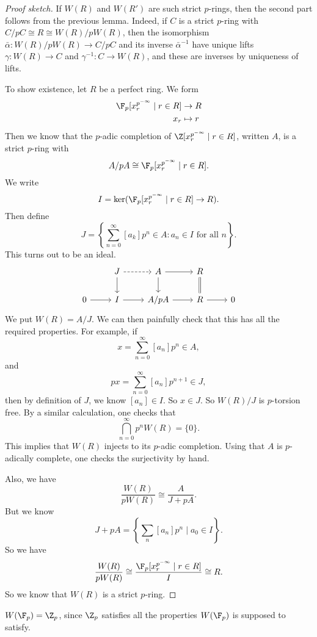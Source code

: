 \documentclass[a4paper]{article}
\begin{document}
\begin{proof}[Proof sketch]
  If $W(R)$ and $W(R')$ are such strict $p$-rings, then the second part follows from the previous lemma. Indeed, if $C$ is a strict $p$-ring with $C/pC \cong R \cong W(R)/pW(R)$, then the isomorphism $\bar{\alpha}: W(R)/pW(R) \to C/pC$ and its inverse $\bar{\alpha}^{-1}$ have unique lifts $\gamma: W(R) \to C$ and $\gamma^{-1}: C \to W(R)$, and these are inverses by uniqueness of lifts.

  To show existence, let $R$ be a perfect ring. We form
  \begin{align*}
    \F_p[x_r^{p^{-\infty}}\mid r \in R] &\to R\\
    x_r&\mapsto r
  \end{align*}
  Then we know that the $p$-adic completion of $\Z[x_r^{p^{-\infty}}\mid r \in R]$, written $A$, is a strict $p$-ring with
  \[
    A/pA \cong \F_p[x_r^{p^{-\infty}}\mid r \in R].
  \]
  We write
  \[
    I = \ker(\F_p[x_r^{p^{-\infty}}\mid r \in R] \to R).
  \]
  Then define
  \[
    J = \left\{\sum_{n = 0}^\infty [a_k] p^n \in A: a_n \in I\text{ for all $n$}\right\}.
  \]
  This turns out to be an ideal.
  \[
    \begin{tikzcd}
      & J \ar[r, dashed] \ar[d] & A \ar[r] \ar[d] & R \ar[d, equals]\\
      0 \ar[r] & I \ar[r] & A/pA \ar[r] & R \ar[r] & 0
    \end{tikzcd}
  \]
  We put $W(R) = A/J$. We can then painfully check that this has all the required properties. For example, if
  \[
    x = \sum_{n = 0}^\infty [a_n] p^n \in A,
  \]
  and
  \[
    px = \sum_{n = 0}^\infty [a_n] p^{n + 1} \in J,
  \]
  then by definition of $J$, we know $[a_n] \in I$. So $x \in J$. So $W(R)/J$ is $p$-torsion free. By a similar calculation, one checks that
  \[
    \bigcap_{n = 0}^\infty p^n W(R) = \{0\}.
  \]
  This implies that $W(R)$ injects to its $p$-adic completion. Using that $A$ is $p$-adically complete, one checks the surjectivity by hand.

  Also, we have
  \[
    \frac{W(R)}{p W(R)} \cong \frac{A}{J + pA}.
  \]
  But we know
  \[
    J + pA = \left\{\sum_n [a_n] p^n \mid a_0 \in I\right\}.
  \]
  So we have
  \[
    \frac{W(R)}{pW(R)} \cong \frac{\F_p[x_r^{p^{-\infty}}\mid r \in R]}{I} \cong R.
  \]
  So we know that $W(R)$ is a strict $p$-ring.
\end{proof}

\begin{eg}
  $W(\F_p) = \Z_p$, since $\Z_p$ satisfies all the properties $W(\F_p)$ is supposed to satisfy.
\end{eg}
\end{document}
